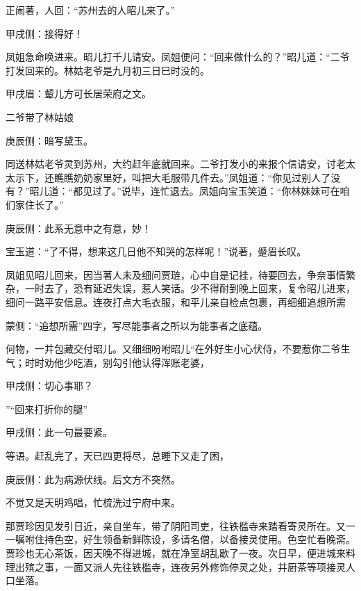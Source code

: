 \begin{parag}
    正闹著，人回：“苏州去的人昭儿来了。”\begin{note}甲戌侧：接得好！\end{note}凤姐急命唤进来。昭儿打千儿请安。凤姐便问：“回来做什么的？”昭儿道：“二爷打发回来的。林姑老爷是九月初三日巳时没的。\begin{note}甲戌眉：颦儿方可长居荣府之文。\end{note}二爷带了林姑娘\begin{note}庚辰侧：暗写黛玉。\end{note}同送林姑老爷灵到苏州，大约赶年底就回来。二爷打发小的来报个信请安，讨老太太示下，还瞧瞧奶奶家里好，叫把大毛服带几件去。”凤姐道：“你见过别人了没有？”昭儿道：“都见过了。”说毕，连忙退去。凤姐向宝玉笑道：“你林妹妹可在咱们家住长了。”\begin{note}庚辰侧：此系无意中之有意，妙！\end{note}宝玉道：“了不得，想来这几日他不知哭的怎样呢！”说著，蹙眉长叹。
\end{parag}


\begin{parag}
    凤姐见昭儿回来，因当著人未及细问贾琏，心中自是记挂，待要回去，争奈事情繁杂，一时去了，恐有延迟失误，惹人笑话。少不得耐到晚上回来，复令昭儿进来，细问一路平安信息。连夜打点大毛衣服，和平儿亲自检点包裹，再细细追想所需\begin{note}蒙侧：“追想所需”四字，写尽能事者之所以为能事者之底蕴。\end{note}何物，一并包藏交付昭儿。又细细吩咐昭儿“在外好生小心伏侍，不要惹你二爷生气；时时劝他少吃酒，别勾引他认得浑账老婆，\begin{note}甲戌侧：切心事耶？\end{note}”“回来打折你的腿”\begin{note}甲戌侧：此一句最要紧。\end{note}等语。赶乱完了，天已四更将尽，总睡下又走了困，\begin{note}庚辰侧：此为病源伏线。后文方不突然。\end{note}不觉又是天明鸡唱，忙梳洗过宁府中来。
\end{parag}


\begin{parag}
    那贾珍因见发引日近，亲自坐车，带了阴阳司吏，往铁槛寺来踏看寄灵所在。又一一嘱咐住持色空，好生领备新鲜陈设，多请名僧，以备接灵使用。色空忙看晚斋。贾珍也无心茶饭，因天晚不得进城，就在净室胡乱歇了一夜。次日早，便进城来料理出殡之事，一面又派人先往铁槛寺，连夜另外修饰停灵之处，并厨茶等项接灵人口坐落。
\end{parag}


